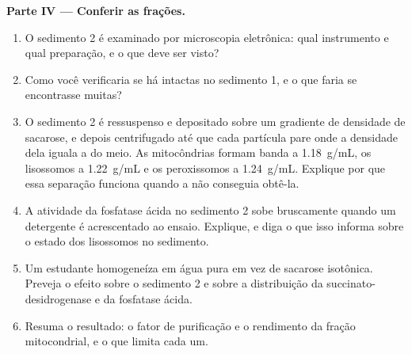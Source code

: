 \begin{problem}
\medskip
\noindent\textbf{Parte IV --- Conferir as frações.}
\begin{enumerate}[resume]
  \item O sedimento 2 é examinado por microscopia eletrônica: qual
        instrumento e qual preparação, e o que deve ser visto?
  \item Como você verificaria se há  intactas no sedimento 1, e o
        que faria se encontrasse muitas?
  \item O sedimento 2 é ressuspenso e depositado sobre um gradiente de
        densidade de sacarose, e depois centrifugado até que cada
        partícula pare onde a densidade dela iguala a do meio. As
        mitocôndrias formam banda a \qty{1.18}{g/mL}, os lisossomos a
        \qty{1.22}{g/mL} e os peroxissomos a \qty{1.24}{g/mL}. Explique
        por que essa separação funciona quando a  não conseguia obtê-la.
  \item A atividade da fosfatase ácida no sedimento 2 sobe bruscamente
        quando um detergente é acrescentado ao ensaio. Explique, e diga
        o que isso informa sobre o estado dos lisossomos no sedimento.
  \item Um estudante homogeneíza em água pura em vez de sacarose
        isotônica. Preveja o efeito sobre o sedimento 2 e sobre a
        distribuição da succinato-desidrogenase e da fosfatase ácida.
  \item Resuma o resultado: o fator de purificação e o rendimento da
        fração mitocondrial, e o que limita cada um.
\end{enumerate}
\end{problem}
